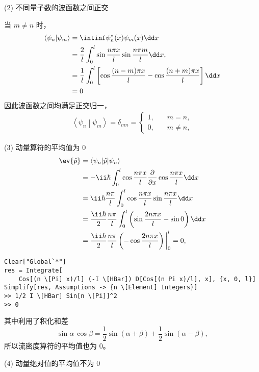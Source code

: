 (2) 不同量子数的波函数之间正交

当 $m \neq n$ 时，
\begin{align}
    \left\langle \psi_n \middle | \psi_m \right\rangle 
    &= \intinf \psi_n^* (x) \psi_m(x) \dd x \\
    &= \frac2l \int_0^l \sin \frac{n\pi x}{l} \sin \frac{n\pi m }{l} \dd x, \\
    &= \frac 1l \int_0^l \left[
        \cos \frac{(n-m)\pi x}l - \cos\frac{(n+m)\pi x}l
    \right] \dd x \\
    &= 0
\end{align}
因此波函数之间均满足正交归一，
\begin{eqnarray}
    \left\langle \psi_n \middle | \psi_m \right\rangle = \delta_{mn} = \begin{cases}
        1, \quad &m=n,\\
        0, \quad &m\neq n,
    \end{cases}
\end{eqnarray}

(3) 动量算符的平均值为 0
\begin{align}
    \ev{\hat p} 
    &= \left\langle \psi_n \middle| \hat p \middle| \psi_n \right\rangle \\
    &= - \ii \hbar \int_0^l \cos\frac{n \pi x}l \frac{\partial}{\partial x} \cos \frac{n\pi x}l \dd x \\
    &= \ii\hbar \frac{n\pi}l \int_0^l \cos \frac{n\pi x}l \sin\frac{n\pi x}l \dd x \\
    &= \frac{\ii\hbar}2 \frac{n\pi}l \int_0^l \left(\sin\frac{2n\pi x}{l} - \sin 0\right)\dd x \\
    &= \frac{\ii\hbar}2 \frac{n\pi}l \left(- \cos \frac{2n\pi x}l\right) \bigg|_0^l = 0,  
\end{align}
\begin{lstlisting}
Clear["Global`*"]
res = Integrate[
    Cos[(n \[Pi] x)/l] (-I \[HBar]) D[Cos[(n Pi x)/l], x], {x, 0, l}]
Simplify[res, Assumptions -> {n \[Element] Integers}]
>> 1/2 I \[HBar] Sin[n \[Pi]]^2
>> 0
\end{lstlisting}
其中利用了积化和差
\begin{equation}
    \sin\alpha \, \cos\beta = \frac12 \sin(\alpha+\beta) + \frac12 \sin(\alpha-\beta),
\end{equation}
所以流密度算符的平均值也为 0。

(4) 动量绝对值的平均值不为 0

